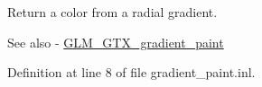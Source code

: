 Return a color from a radial gradient. \begin{DoxySeeAlso}{See also}
-\/ \mbox{\hyperlink{group__gtx__gradient__paint}{G\+L\+M\+\_\+\+G\+T\+X\+\_\+gradient\+\_\+paint}} 
\end{DoxySeeAlso}


Definition at line 8 of file gradient\+\_\+paint.\+inl.

